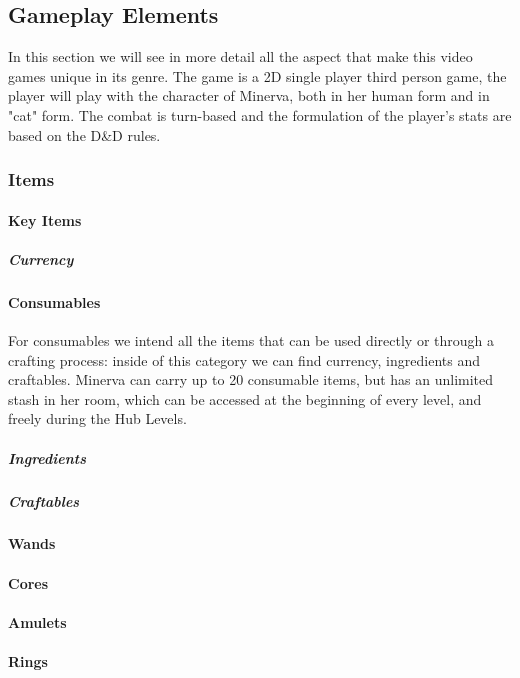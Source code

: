 \subsection{Gameplay Elements}

In this section we will see in more detail all the aspect that make this video games unique in its genre. The game is a 2D single player third person game, the player will play with the character of Minerva, both in her human form and in "cat" form. The combat is turn-based and the formulation of the player's stats are based on the D\&D rules.



\subsubsection{Items}

\paragraph{Key Items}


\subparagraph{Currency}


\pagebreak
\paragraph{Consumables}
For consumables we intend all the items that can be used directly or through a crafting process: inside of this category we can find currency, ingredients and craftables. Minerva can carry up to 20 consumable items, but has an unlimited stash in her room, which can be accessed at the beginning of every level, and freely during the Hub Levels. 

\subparagraph{Ingredients}


\subparagraph{Craftables}


\paragraph{Wands}


\paragraph{Cores}


\paragraph{Amulets}


\paragraph{Rings}




